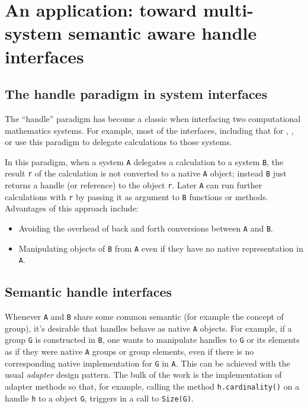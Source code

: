 \section{An application: toward multi-system semantic aware handle interfaces}

\subsection{The handle paradigm in system interfaces}\label{the-handle-paradigm-in-system-interfaces}

The ``handle'' paradigm has become a classic when interfacing two
computational mathematics systems. For example, most of the \Sage
interfaces, including that for \GAP, \Singular, or \Pari use this
paradigm to delegate calculations to those systems.

In this paradigm, when a system \texttt{A} delegates a calculation to a
system \texttt{B}, the result \texttt{r} of the calculation is not
converted to a native \texttt{A} object; instead \texttt{B} just returns
a handle (or reference) to the object \texttt{r}. Later \texttt{A} can
run further calculations with \texttt{r} by passing it as argument to
\texttt{B} functions or methods. Advantages of this approach include:

\begin{itemize}
\item Avoiding the overhead of back and forth conversions between
  \texttt{A} and \texttt{B}.
\item Manipulating objects of \texttt{B} from \texttt{A} even if they
  have no native representation in \texttt{A}.
\end{itemize}

\subsection{Semantic handle interfaces}\label{semantic-handle-interfaces}

Whenever \texttt{A} and \texttt{B} share some common semantic (for
example the concept of group), it's desirable that handles behave as
native \texttt{A} objects. For example, if a group \texttt{G} is
constructed in \texttt{B}, one wants to manipulate handles to
\texttt{G} or its elements as if they were native \texttt{A} groups or
group elements, even if there is no corresponding native
implementation for \texttt{G} in \texttt{A}.  This can be achieved
with the usual \emph{adapter} design pattern. The bulk of the work is
the implementation of adapter methods so that, for example, calling
the method \texttt{h.cardinality()} on a \Sage handle \texttt{h} to a
\GAP object \texttt{G}, triggers in \GAP a call to \texttt{Size(G)}.

